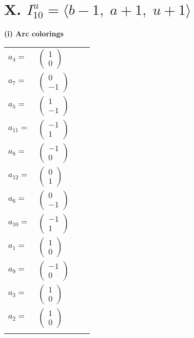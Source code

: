 \documentclass[1p]{elsarticle_modified}
\theoremstyle{definition}
\begin{document}
\centering \section*{X. $I^u_{10}= \langle b-1,\;a+1,\;u+1 \rangle$}
\flushleft \textbf{(i) Arc colorings}\\
\begin{tabular}{m{7pt} m{180pt} m{7pt} m{180pt} }
\flushright $a_{4}=$&$\begin{pmatrix}1\\0\end{pmatrix}$ \\
\flushright $a_{7}=$&$\begin{pmatrix}0\\-1\end{pmatrix}$ \\
\flushright $a_{5}=$&$\begin{pmatrix}1\\-1\end{pmatrix}$ \\
\flushright $a_{11}=$&$\begin{pmatrix}-1\\1\end{pmatrix}$ \\
\flushright $a_{8}=$&$\begin{pmatrix}-1\\0\end{pmatrix}$ \\
\flushright $a_{12}=$&$\begin{pmatrix}0\\1\end{pmatrix}$ \\
\flushright $a_{6}=$&$\begin{pmatrix}0\\-1\end{pmatrix}$ \\
\flushright $a_{10}=$&$\begin{pmatrix}-1\\1\end{pmatrix}$ \\
\flushright $a_{1}=$&$\begin{pmatrix}1\\0\end{pmatrix}$ \\
\flushright $a_{9}=$&$\begin{pmatrix}-1\\0\end{pmatrix}$ \\
\flushright $a_{3}=$&$\begin{pmatrix}1\\0\end{pmatrix}$ \\
\flushright $a_{2}=$&$\begin{pmatrix}1\\0\end{pmatrix}$\\&\end{tabular}
\end{document}
